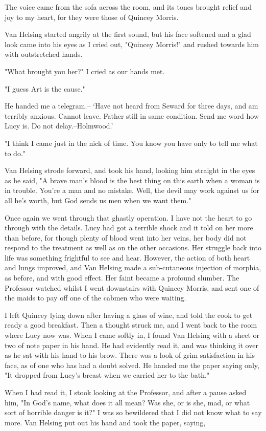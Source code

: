The voice came from the sofa across the room, and its tones brought relief and joy to my heart, for they were those of Quincey Morris. 

Van Helsing started angrily at the first sound, but his face softened and a glad look came into his eyes as I cried out, "Quincey Morris!" and rushed towards him with outstretched hands. 

"What brought you her?" I cried as our hands met. 

"I guess Art is the cause." 

He handed me a telegram.-- `Have not heard from Seward for three days, and am terribly anxious. Cannot leave. Father still in same condition. Send me word how Lucy is. Do not delay.--Holmwood.' 

"I think I came just in the nick of time. You know you have only to tell me what to do." 

Van Helsing strode forward, and took his hand, looking him straight in the eyes as he said, "A brave man's blood is the best thing on this earth when a woman is in trouble. You're a man and no mistake. Well, the devil may work against us for all he's worth, but God sends us men when we want them." 

Once again we went through that ghastly operation. I have not the heart to go through with the details. Lucy had got a terrible shock and it told on her more than before, for though plenty of blood went into her veins, her body did not respond to the treatment as well as on the other occasions. Her struggle back into life was something frightful to see and hear. However, the action of both heart and lungs improved, and Van Helsing made a sub-cutaneous injection of morphia, as before, and with good effect. Her faint became a profound slumber. The Professor watched whilst I went downstairs with Quincey Morris, and sent one of the maids to pay off one of the cabmen who were waiting. 

I left Quincey lying down after having a glass of wine, and told the cook to get ready a good breakfast. Then a thought struck me, and I went back to the room where Lucy now was. When I came softly in, I found Van Helsing with a sheet or two of note paper in his hand. He had evidently read it, and was thinking it over as he sat with his hand to his brow. There was a look of grim satisfaction in his face, as of one who has had a doubt solved. He handed me the paper saying only, "It dropped from Lucy's breast when we carried her to the bath." 

When I had read it, I stook looking at the Professor, and after a pause asked him, "In God's name, what does it all mean? Was she, or is she, mad, or what sort of horrible danger is it?" I was so bewildered that I did not know what to say more. Van Helsing put out his hand and took the paper, saying, 

